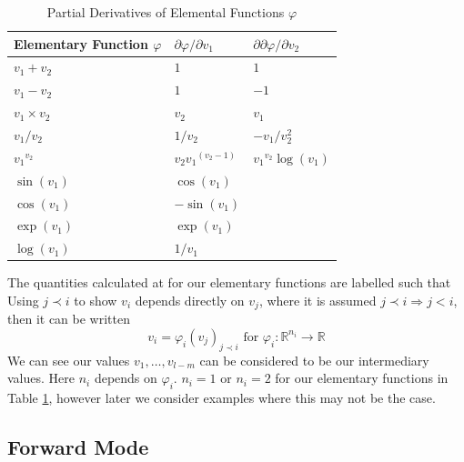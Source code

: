 \documentclass{article}
\begin{document}
\begin{table}[h]
    \centering
    \begin{tabular}{|lll|}
        \hline
        Elementary Function $\varphi$ & $\partial \varphi / \partial {v}_1$ & $\partial \partial \varphi / \partial {v}_2$ \\
        \hline
        $v_1+v_2$ & $1$ & $1$ \\
        $v_1-v_2$ & $1$ & $-1$ \\
        $v_1 \times v_2$ & $v_2$ & $v_1$ \\
        $v_1 / v_2$ & $1/v_2$ & $-v_1/v_2^2$ \\
        ${v_1}^{v_2}$ & $v_2{v_1}^{(v_2-1)}$ & ${v_1}^{v_2}\log(v_1)$ \\
        \hdashline
        $\sin(v_1)$ & $\cos(v_1)$ & \\
        $\cos(v_1)$ & $-\sin(v_1)$ & \\
        $\exp(v_1)$ & $\exp(v_1)$ & \\
        $\log(v_1)$ & $1/v_1$ & \\
        \hline
    \end{tabular}
    \caption{Partial Derivatives of Elemental Functions $\varphi$}
    \label{tab:elemental}
\end{table}

The quantities calculated at for our elementary functions are labelled such that
\begin{equation}
    [ \underbrace{v_{1-n}, \ldots, v_0}_{x} , v_1, \ldots, v_{l-m}, \underbrace{v_{l-m+1}, \ldots, v_l}_{y}]
\end{equation}
Using $j \prec i$ to show $v_i$ depends directly on $v_j$, where it is assumed $j \prec i \Longrightarrow j < i$, then it can be written
\begin{equation}
    v_i = \varphi_i (v_j)_{j \prec i} \text{ for } \varphi_i : \mathbb{R}^{n_i} \longrightarrow \mathbb{R}
\end{equation}
We can see our values $v_1, \ldots, v_{l-m}$ can be considered to be our intermediary values.
Here $n_i$ depends on $\varphi_i$. $n_i=1$ or $n_i=2$ for our elementary functions in Table \ref{tab:elemental}, however later we consider examples where this may not be the case.

\subsection{Forward Mode}
\end{document}
